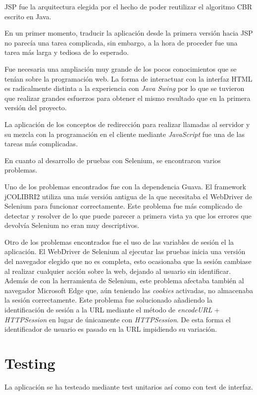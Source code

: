 JSP fue la arquitectura elegida por el hecho de poder reutilizar el algoritmo CBR escrito en Java.

En un primer momento, traducir la aplicación desde la primera versión hacia JSP no parecía una tarea complicada, sin embargo, a la hora de proceder fue una tarea más larga y tediosa de lo esperado.

Fue necesaria una ampliación muy grande de los pocos conocimientos que se tenían sobre la programación web. La forma de interactuar con la interfaz HTML es radicalmente distinta a la experiencia con \emph{Java Swing} por lo que se tuvieron que realizar grandes esfuerzos para obtener el mismo resultado que en la primera versión del proyecto.

La aplicación de los conceptos de redirección para realizar llamadas al servidor y su mezcla con la programación en el cliente mediante \emph{JavaScript} fue una de las tareas más complicadas.

En cuanto al desarrollo de pruebas con Selenium, se encontraron varios problemas.

Uno de los problemas encontrados fue con la dependencia Guava. El framework jCOLIBRI2 utiliza una más versión antigua de la que necesitaba el WebDriver de Selenium para funcionar correctamente. Este problema fue más complicado de detectar y resolver de lo que puede parecer a primera vista ya que los errores que devolvía Selenium no eran muy descriptivos.

Otro de los problemas encontrados fue el uso de las variables de sesión el la aplicación. El WebDriver de Selenium al ejecutar las pruebas inicia una versión del navegador elegido que no es completa, esto ocasionaba que la sesión cambiase al realizar cualquier acción sobre la web, dejando al usuario sin identificar. Además de con la herramienta de Selenium, este problema afectaba también al navegador Microsoft Edge que, aún teniendo las \emph{cookies} activadas, no almacenaba la sesión correctamente. Este problema fue solucionado añadiendo la identificación de sesión a la URL mediante el método de \emph{encodeURL} + \emph{HTTPSession} en lugar de únicamente con \emph{HTTPSession}. De esta forma el identificador de usuario es pasado en la URL impidiendo su variación.


\section{Testing}

La aplicación se ha testeado mediante test unitarios así como con test de interfaz.

